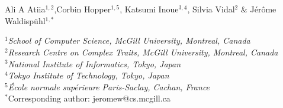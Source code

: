 


{}~\\~\\
\date{}

{\noindent\normalsize{\centering Ali A Atiia{\footnotesize$^{1,2}$},Corbin Hopper{\footnotesize$^{1,5}$}, Katsumi Inoue{\footnotesize$^{3,4}$}, Silvia Vidal{\footnotesize$^{2}$} \&  Jérôme Waldispühl{\footnotesize$^{1,*}$}}}

{\footnotesize
   \noindent$^1$\textit{School of Computer Science, McGill University, Montreal, Canada}~\\
   \noindent$^2$\textit{Research Centre on Complex Traits, McGill University, Montreal, Canada}~\\
   \noindent$^3$\textit{National Institute of Informatics, Tokyo, Japan}~\\
   \noindent$^4$\textit{Tokyo Institute of Technology, Tokyo, Japan}~\\
   \noindent$^5$\textit{École normale supérieure Paris-Saclay, Cachan, France}~\\
   \noindent$^*${Corresponding author: jeromew@cs.mcgill.ca}~\\
}


